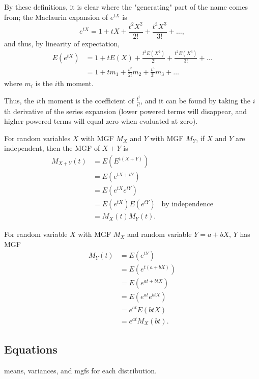 \documentclass[a4paper,10pt]{article}
\begin{document}
By these definitions, it is clear where the "generating" part of the name comes from; the Maclaurin expansion of $e^{tX}$ is 
\begin{equation*}
    e^{tX} = 1 + tX + \frac{t^2X^2}{2!} + \frac{t^3X^3}{3!} + \ldots,
\end{equation*}
and thus, by linearity of expectation, 
\begin{align*}
    E(e^{tX}) &= 1 + tE(X) + \frac{t^2E(X^2)}{2!} + \frac{t^2E(X^3)}{3!} + \ldots \\
              &= 1 + tm_1 + \frac{t^2}{2!}m_2 + \frac{t^3}{3!}m_3 + \ldots 
\end{align*}
where $m_i$ is the $i$th moment. 

Thus, the $i$th moment is the coefficient of $\frac{t^i}{i!}$, and it can be found by taking the $i$th derivative of the series expansion (lower powered terms will disappear, and higher powered terms will equal zero when evaluated at zero).  

For random variables $X$ with MGF $M_X$ and $Y$ with MGF $M_Y$, if $X$ and $Y$ are independent, then the MGF of $X+Y$ is 
\begin{align*}
    M_{X+Y}(t) &= E(E^{t(X+Y)}) \\
               &= E(e^{tX+tY}) \\
               &= E(e^{tX}e^{tY}) \\
               &= E(e^{tX})E(e^{tY}) &\text{by independence} \\
               &= M_X(t)M_Y(t).
\end{align*}

For random variable $X$ with MGF $M_X$ and random variable $Y=a+bX$, $Y$ has MGF 
\begin{align*}
    M_Y(t) &= E(e^{tY}) \\
           &= E(e^{t(a+bX)}) \\
           &= E(e^{at + btX}) \\
           &= E(e^{at}e^{btX}) \\
           &= e^{at}E(btX) \\
           &= e^{at}M_X(bt).
\end{align*}

\subsection{Equations}
means, variances, and mgfs for each distribution. 

\end{document}
